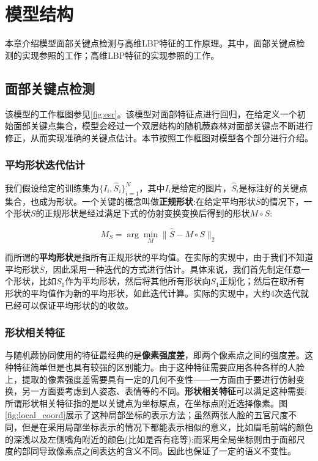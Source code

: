 
\section{模型结构}
\label{model}

本章介绍模型面部关键点检测与高维LBP特征的工作原理。其中，面部关键点检测的实现参照\cite{}的工作；高维LBP特征的实现参照\cite{}的工作。

\subsection{面部关键点检测}

该模型的工作框图参见\ref{fig:esr}。该模型对面部特征点进行回归，在给定义一个初始面部关键点集合，模型会经过一个双层结构的随机蕨森林对面部关键点不断进行修正，从而实现准确的关键点估计。本节按照工作框图对模型各个部分进行介绍。

\subsubsection{平均形状迭代估计}

我们假设给定的训练集为$\{I_i, \hat{S}_i\}_{i = 1}^{N}$，其中$I_i$是给定的图片，$\hat{S}_i$是标注好的关键点集合，也成为形状。一个关键的概念叫做\textbf{正规形状}:在给定平均形状$\bar{S}$的情况下，一个形状$S$的正规形状是经过满足下式的仿射变换变换后得到的形状$M \circ S$:

\[
M_S = \arg\min_M \|\hat{S} - M \circ S\|_2
\]

而所谓的\textbf{平均形状}是指所有正规形状的平均值。在实际的实现中，由于我们不知道平均形状$\bar{S}$，因此采用一种迭代的方式进行估计。具体来说，我们首先制定任意一个形状，比如$S_1$作为平均形状，然后将其他所有形状向$S_1$正规化；然后在取所有形状的平均值作为新的平均形状，如此迭代计算。实际的实现中，大约4次迭代就已经可以保证平均形状的的收敛。

\subsubsection{形状相关特征}

与随机蕨协同使用的特征最经典的是\textbf{像素强度差}，即两个像素点之间的强度差。这种特征简单但是也具有较强的区别能力。由于这种特征需要应用各种各样的人脸上，提取的像素强度差需要具有一定的几何不变性——一方面由于要进行仿射变换，另一方面要考虑到人姿态、表情等的不同。\textbf{形状相关特征}可以满足这种需要:所谓形状相关特征指的是以关键点为坐标原点，在坐标点附近选择像素。图\ref{fig:local_coord}展示了这种局部坐标的表示方法；虽然两张人脸的五官尺度不同，但是在采用局部坐标表示的情况下都能表示相似的意义，比如眉毛前端的颜色的深浅以及左侧嘴角附近的颜色(比如是否有痣等);而采用全局坐标则由于面部尺度的部同导致像素点之间表达的含义不同。因此也保证了一定的语义不变性。

